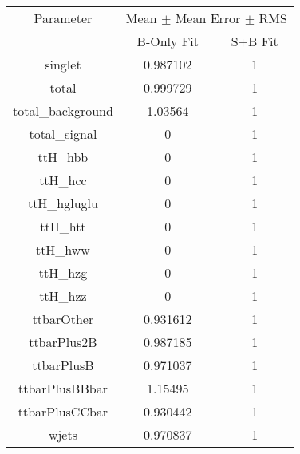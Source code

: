 \begin{table}
\centering

\begin{tabular}{ccc}
\toprule
Parameter & \multicolumn{2}{c}{Mean $\pm$ Mean Error $\pm$ RMS}\\
 & B-Only Fit & S+B Fit\\
\midrule
singlet & \num{0.987102} & \num{1}\\
total & \num{0.999729} & \num{1}\\
total\_background & \num{1.03564} & \num{1}\\
total\_signal & \num{0} & \num{1}\\
ttH\_hbb & \num{0} & \num{1}\\
ttH\_hcc & \num{0} & \num{1}\\
ttH\_hgluglu & \num{0} & \num{1}\\
ttH\_htt & \num{0} & \num{1}\\
ttH\_hww & \num{0} & \num{1}\\
ttH\_hzg & \num{0} & \num{1}\\
ttH\_hzz & \num{0} & \num{1}\\
ttbarOther & \num{0.931612} & \num{1}\\
ttbarPlus2B & \num{0.987185} & \num{1}\\
ttbarPlusB & \num{0.971037} & \num{1}\\
ttbarPlusBBbar & \num{1.15495} & \num{1}\\
ttbarPlusCCbar & \num{0.930442} & \num{1}\\
wjets & \num{0.970837} & \num{1}\\
\bottomrule
\end{tabular}
\end{table}